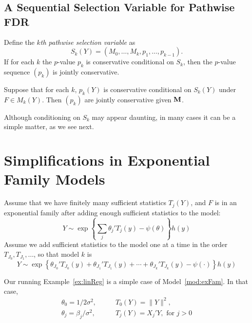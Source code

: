 \documentclass{article}
\begin{document}
\subsection{A Sequential Selection Variable for Pathwise FDR}

Define the {\em $k$th pathwise selection variable} as 
\begin{equation}
  S_k(Y) = (M_0,\ldots,M_k,p_1,\ldots,p_{k-1}).
\end{equation}
If for each $k$ the $p$-value $p_k$ is conservative conditional on $S_k$, then the $p$-value sequence $(p_k)$ is jointly conservative. 
\begin{proposition}
  Suppose that for each $k$, $p_k(Y)$ is conservative conditional on $S_k(Y)$ under $F\in M_k(Y)$. Then $(p_k)$ are jointly conservative given $\mathbf{M}$.
\end{proposition}

Although conditioning on $S_k$ may appear daunting, in many cases it can be a simple matter, as we see next.

\section{Simplifications in Exponential Family Models}

\begin{model}\label{mod:exFam}
  Assume that we have finitely many sufficient statistics $T_j(Y)$, and $F$ is in an exponential family after adding enough sufficient statistics to the model:
  \begin{equation}
    Y \sim \exp\left\{\sum_j \theta_j ' T_j(y) - \psi(\theta)\right\} h(y)
  \end{equation}
  Assume we add sufficient statistics to the model one at a time in the order $T_{J_0}, T_{J_1}, \ldots$, so that model $k$ is
  \begin{equation}
    Y \sim \exp\left\{\theta_{J_0} ' T_{J_0}(y) + \theta_{J_1}'T_{J_1}(y) + \cdots + \theta_{J_k}'T_{J_k}(y) - \psi(\cdot)\right\} h(y)
  \end{equation}
\end{model}

Our running Example~\ref{ex:linReg} is a simple case of Model~\ref{mod:exFam}. In that case,
\begin{align*}
  \theta_0 = 1/2\sigma^2, &\qquad T_0(Y) = \|Y\|^2,\\
  \theta_j = \beta_j/\sigma^2, &\qquad 
T_j(Y) = X_j'Y, \text{ for } j>0
\end{align*}
\end{document}
